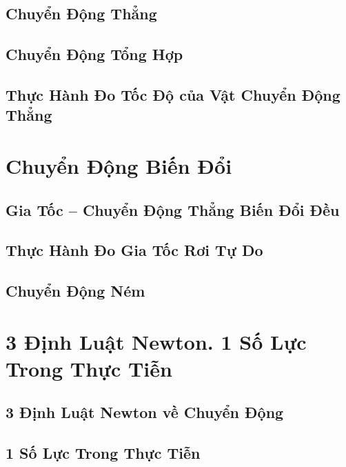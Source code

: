 \documentclass[oneside]{book}
\numberwithin{equation}{section}
\begin{document}
\section{Chuyển Động Thẳng}

\section{Chuyển Động Tổng Hợp}

\section{Thực Hành Đo Tốc Độ của Vật Chuyển Động Thẳng}


\chapter{Chuyển Động Biến Đổi}

\section{Gia Tốc -- Chuyển Động Thẳng Biến Đổi Đều}

\section{Thực Hành Đo Gia Tốc Rơi Tự Do}

\section{Chuyển Động Ném}


\chapter{3 Định Luật Newton. 1 Số Lực Trong Thực Tiễn}

\section{3 Định Luật Newton về Chuyển Động}

\section{1 Số Lực Trong Thực Tiễn}
\end{document}

